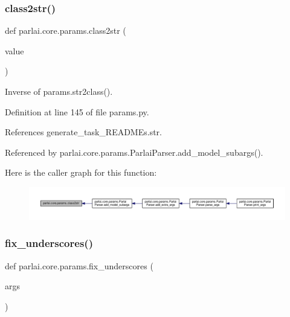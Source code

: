 \subsubsection{\texorpdfstring{class2str()}{class2str()}}
{\footnotesize\ttfamily def parlai.\+core.\+params.\+class2str (\begin{DoxyParamCaption}\item[{}]{value }\end{DoxyParamCaption})}

\begin{DoxyVerb}Inverse of params.str2class().\end{DoxyVerb}
 

Definition at line 145 of file params.\+py.



References generate\+\_\+task\+\_\+\+R\+E\+A\+D\+M\+Es.\+str.



Referenced by parlai.\+core.\+params.\+Parlai\+Parser.\+add\+\_\+model\+\_\+subargs().

Here is the caller graph for this function\+:
\nopagebreak
\begin{figure}[H]
\begin{center}
\leavevmode
\includegraphics[width=350pt]{namespaceparlai_1_1core_1_1params_a4abab85fb7a745de31fcc73de5840a60_icgraph}
\end{center}
\end{figure}
\mbox{\label{namespaceparlai_1_1core_1_1params_afe2837a1dc21017be30cc7e3cb3696b8}} 
\subsubsection{\texorpdfstring{fix\+\_\+underscores()}{fix\_underscores()}}
{\footnotesize\ttfamily def parlai.\+core.\+params.\+fix\+\_\+underscores (\begin{DoxyParamCaption}\item[{}]{args }\end{DoxyParamCaption})}

